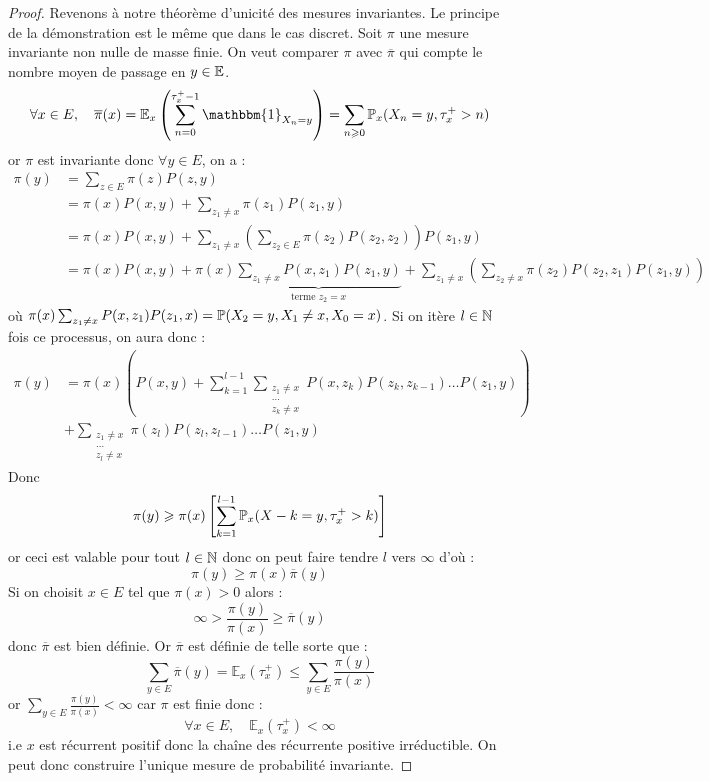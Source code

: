\begin{proof}
    Revenons à notre théorème d'unicité des mesures invariantes. Le principe de la démonstration est le même que 
    dans le cas discret. Soit $ \pi$ une mesure invariante non nulle de masse finie. On veut comparer $ \pi$ 
    avec $ \overline{ \pi}$ qui compte le nombre moyen de passage en $y \in \mathbb{E}$. 
        \[ \forall x \in E, \quad \overline{ \pi}(x) = \mathbb{E}_x \left( \sum_{n=0}^{ \tau_x^+ - 1} \mathbbm{1}_{X_n = y}  \right) = \sum_{n \geqslant 0} \myP_x( X_n = y, \tau_x^+ > n) \] 
    or $ \pi$ est invariante donc $ \forall y \in E$, on a : 
        \begin{align*}
            \pi(y) &= \sum_{z \in E} \pi(z) P(z,y) \\
            &= \pi(x)P(x,y) + \sum_{z_1 \not = x} \pi(z_1)P(z_1, y) \\ 
            &= \pi(x) P(x,y) + \sum_{z_1 \not = x} \left( \sum_{z_2 \in E} \pi(z_2)P(z_2, z_2) \right) P(z_1, y) \\ 
            &= \pi(x) P(x,y) + \pi(x) \underbrace{\sum_{z_1 \not = x} P(x,z_1)P(z_1,y)}_{ \text{terme } z_2 = x } 
            + \sum_{z_1 \not = x} \left( \sum_{z_2 \not = x} \pi(z_2) P(z_2, z_1) P(z_1, y)\right) 
        \end{align*}
    où $ \pi(x) \sum_{z_1 \not = x} P(x,z_1)P(z_1,x) = \mathbb{P}(X_2 = y, X_1 \not = x, X_0 = x)$. Si on itère $ l \in \mathbb{N}$ 
    fois ce processus, on aura donc : 
        \begin{align*}
            \pi(y) &= \pi(x) \left( P(x,y) + \sum_{k=1}^{l-1} \sum_{\substack{z_1 \not = x \\ \dots \\ z_k \not = x}} P(x,z_k) P(z_k, z_{k-1}) \dots P(z_1, y)\right) \\ 
            & + \sum_{\substack{z_1 \not = x \\ \dots \\ z_l \not = x}} \pi(z_l) P(z_l, z_{l-1}) \dots P(z_1, y) 
        \end{align*}
    Donc 
        \[ \pi(y) \geqslant \pi(x) \left[ \sum_{k=1}^{l-1} \mathbb{P}_x(X-k = y, \tau_x^+ > k ) \right] \]
    or ceci est valable pour tout $l \in \mathbb{N}$ donc on peut faire tendre $l$ vers $\infty$ d'où : 
        \[ \pi(y) \geqslant \pi(x) \overline{ \pi}(y) \] 
    Si on choisit $x \in E$ tel que $ \pi(x) > 0$ alors : 
        \[ \infty > \frac{ \pi(y)}{ \pi(x)} \geqslant \overline{ \pi}(y) \] 
    donc $ \overline{ \pi}$ est bien définie. Or $ \overline{ \pi}$ est définie de telle sorte que : 
        \[ \sum_{y \in E} \overline{ \pi}(y) = \mathbb{E}_x( \tau_x^+) \leqslant \sum_{y \in E} \frac{ \pi(y)}{ \pi(x)}   \] 
    or $ \sum_{y \in E} \frac{ \pi(y)}{ \pi(x)} < \infty$ car $ \pi$ est finie donc : 
        \[ \forall x \in E, \quad \mathbb{E}_x( \tau_x^+) < \infty  \] 
    i.e $x$ est récurrent positif donc la chaîne des récurrente positive irréductible. On peut donc construire l'unique 
    mesure de probabilité invariante. 
\end{proof}


